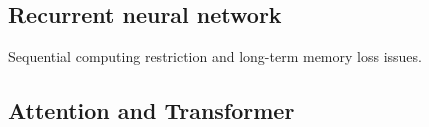 \citet{gu2018recent}

\subsection{Recurrent neural network}
\citet{jordan1997serial}

\citet{hochreiter1997long}

\citet{sherstinsky2020fundamentals}

\citet{chung2014empirical}

Sequential computing restriction and long-term memory loss issues.

\subsection{Attention and Transformer}
\citet{bahdanau2016neural}


